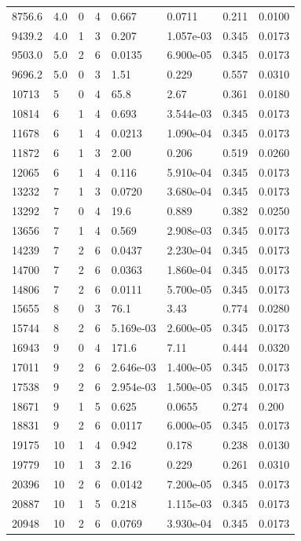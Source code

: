 \documentclass[preview]{standalone}
\begin{document}
{{\begin{tabular}{L{1.2cm}C{1.2cm} C{0.3cm}C{0.5cm} C{1.4cm}C{1.4cm} C{1.4cm}C{1.4cm}}
  8756.6  &   4.0  & 0     &  4 &  0.667  & 0.0711  & 0.211 &  0.0100   \\ 
  9439.2  &   4.0  & 1     &  3 &  0.207  & 1.057e-03  & 0.345 &  0.0173   \\ 
  9503.0  &   5.0  & 2     &  6 &  0.0135  & 6.900e-05  & 0.345 &  0.0173   \\ 
  9696.2  &   5.0  & 0     &  3 &  1.51  & 0.229  & 0.557 &  0.0310   \\ 
  10713  &     5  & 0     &  4 &  65.8  & 2.67  & 0.361 &  0.0180   \\ 
  10814  &     6  & 1     &  4 &  0.693  & 3.544e-03  & 0.345 &  0.0173   \\ 
  11678  &     6  & 1     &  4 &  0.0213  & 1.090e-04  & 0.345 &  0.0173   \\ 
  11872  &     6  & 1     &  3 &  2.00  & 0.206  & 0.519 &  0.0260   \\ 
  12065  &     6  & 1     &  4 &  0.116  & 5.910e-04  & 0.345 &  0.0173   \\ 
  13232  &     7  & 1     &  3 &  0.0720  & 3.680e-04  & 0.345 &  0.0173   \\ 
  13292  &     7  & 0     &  4 &  19.6  & 0.889  & 0.382 &  0.0250   \\ 
  13656  &     7  & 1     &  4 &  0.569  & 2.908e-03  & 0.345 &  0.0173   \\ 
  14239  &     7  & 2     &  6 &  0.0437  & 2.230e-04  & 0.345 &  0.0173   \\ 
  14700  &     7  & 2     &  6 &  0.0363  & 1.860e-04  & 0.345 &  0.0173   \\ 
  14806  &     7  & 2     &  6 &  0.0111  & 5.700e-05  & 0.345 &  0.0173   \\ 
  15655  &     8  & 0     &  3 &  76.1  & 3.43  & 0.774 &  0.0280   \\ 
  15744  &     8  & 2     &  6 &  5.169e-03  & 2.600e-05  & 0.345 &  0.0173   \\ 
  16943  &     9  & 0     &  4 &  171.6  & 7.11  & 0.444 &  0.0320   \\ 
  17011  &     9  & 2     &  6 &  2.646e-03  & 1.400e-05  & 0.345 &  0.0173   \\ 
  17538  &     9  & 2     &  6 &  2.954e-03  & 1.500e-05  & 0.345 &  0.0173   \\ 
  18671  &     9  & 1     &  5 &  0.625  & 0.0655  & 0.274 &  0.200   \\ 
  18831  &     9  & 2     &  6 &  0.0117  & 6.000e-05  & 0.345 &  0.0173   \\ 
  19175  &    10  & 1     &  4 &  0.942  & 0.178  & 0.238 &  0.0130   \\ 
  19779  &    10  & 1     &  3 &  2.16  & 0.229  & 0.261 &  0.0310   \\ 
  20396  &    10  & 2     &  6 &  0.0142  & 7.200e-05  & 0.345 &  0.0173   \\ 
  20887  &    10  & 1     &  5 &  0.218  & 1.115e-03  & 0.345 &  0.0173   \\ 
  20948  &    10  & 2     &  6 &  0.0769  & 3.930e-04  & 0.345 &  0.0173   \\ 
\hline 
\end{tabular} 

}}
\end{document}
